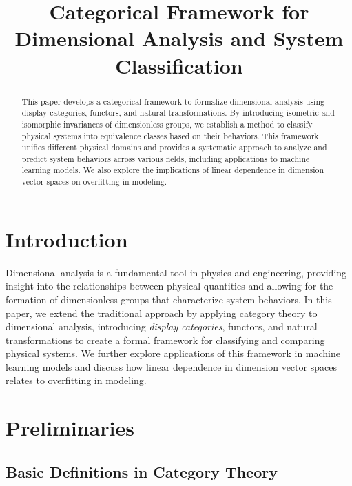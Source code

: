 \documentclass{article}
\title{Categorical Framework for Dimensional Analysis and System Classification}
\author{}
\date{}
\theoremstyle{definition}
\theoremstyle{remark}
\begin{document}
	
	\maketitle
	
	\begin{abstract}
		This paper develops a categorical framework to formalize dimensional analysis using display categories, functors, and natural transformations. By introducing isometric and isomorphic invariances of dimensionless groups, we establish a method to classify physical systems into equivalence classes based on their behaviors. This framework unifies different physical domains and provides a systematic approach to analyze and predict system behaviors across various fields, including applications to machine learning models. We also explore the implications of linear dependence in dimension vector spaces on overfitting in modeling.
	\end{abstract}
	
	\tableofcontents
	
	\section{Introduction}
	
	Dimensional analysis is a fundamental tool in physics and engineering, providing insight into the relationships between physical quantities and allowing for the formation of dimensionless groups that characterize system behaviors. In this paper, we extend the traditional approach by applying category theory to dimensional analysis, introducing \emph{display categories}, functors, and natural transformations to create a formal framework for classifying and comparing physical systems. We further explore applications of this framework in machine learning models and discuss how linear dependence in dimension vector spaces relates to overfitting in modeling.
	
	\section{Preliminaries}
	
	\subsection{Basic Definitions in Category Theory}
	
\end{document}
